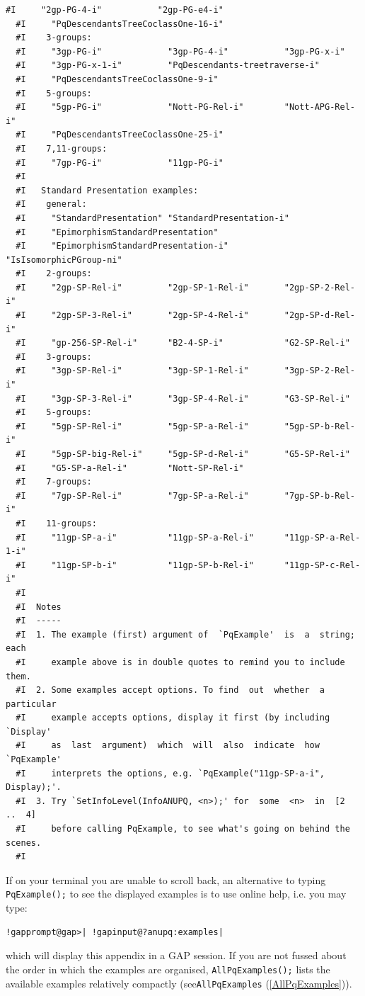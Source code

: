 \documentclass[a4paper,11pt]{report}
\begin{document}
{\begin{Verbatim}[commandchars=!@|,fontsize=\small,frame=single,label=Example]
  #I     "2gp-PG-4-i"           "2gp-PG-e4-i"
  #I     "PqDescendantsTreeCoclassOne-16-i"
  #I    3-groups:
  #I     "3gp-PG-i"             "3gp-PG-4-i"           "3gp-PG-x-i"
  #I     "3gp-PG-x-1-i"         "PqDescendants-treetraverse-i"
  #I     "PqDescendantsTreeCoclassOne-9-i"
  #I    5-groups:
  #I     "5gp-PG-i"             "Nott-PG-Rel-i"        "Nott-APG-Rel-i"
  #I     "PqDescendantsTreeCoclassOne-25-i"
  #I    7,11-groups:
  #I     "7gp-PG-i"             "11gp-PG-i"
  #I  
  #I   Standard Presentation examples:
  #I    general:
  #I     "StandardPresentation" "StandardPresentation-i"
  #I     "EpimorphismStandardPresentation"
  #I     "EpimorphismStandardPresentation-i"           "IsIsomorphicPGroup-ni"
  #I    2-groups:
  #I     "2gp-SP-Rel-i"         "2gp-SP-1-Rel-i"       "2gp-SP-2-Rel-i"
  #I     "2gp-SP-3-Rel-i"       "2gp-SP-4-Rel-i"       "2gp-SP-d-Rel-i"
  #I     "gp-256-SP-Rel-i"      "B2-4-SP-i"            "G2-SP-Rel-i"
  #I    3-groups:
  #I     "3gp-SP-Rel-i"         "3gp-SP-1-Rel-i"       "3gp-SP-2-Rel-i"
  #I     "3gp-SP-3-Rel-i"       "3gp-SP-4-Rel-i"       "G3-SP-Rel-i"
  #I    5-groups:
  #I     "5gp-SP-Rel-i"         "5gp-SP-a-Rel-i"       "5gp-SP-b-Rel-i"
  #I     "5gp-SP-big-Rel-i"     "5gp-SP-d-Rel-i"       "G5-SP-Rel-i"
  #I     "G5-SP-a-Rel-i"        "Nott-SP-Rel-i"
  #I    7-groups:
  #I     "7gp-SP-Rel-i"         "7gp-SP-a-Rel-i"       "7gp-SP-b-Rel-i"
  #I    11-groups:
  #I     "11gp-SP-a-i"          "11gp-SP-a-Rel-i"      "11gp-SP-a-Rel-1-i"
  #I     "11gp-SP-b-i"          "11gp-SP-b-Rel-i"      "11gp-SP-c-Rel-i"
  #I  
  #I  Notes
  #I  -----
  #I  1. The example (first) argument of  `PqExample'  is  a  string;  each
  #I     example above is in double quotes to remind you to include them.
  #I  2. Some examples accept options. To find  out  whether  a  particular
  #I     example accepts options, display it first (by including  `Display'
  #I     as  last  argument)  which  will  also  indicate  how  `PqExample'
  #I     interprets the options, e.g. `PqExample("11gp-SP-a-i", Display);'.
  #I  3. Try `SetInfoLevel(InfoANUPQ, <n>);' for  some  <n>  in  [2  ..  4]
  #I     before calling PqExample, to see what's going on behind the scenes.
  #I  
\end{Verbatim}
 If on your terminal you are unable to scroll back, an alternative to typing \texttt{PqExample();} to see the displayed examples is to use on\texttt{}line help,
i.e.{\nobreakspace} you may type: 
\begin{Verbatim}[commandchars=!@|,fontsize=\small,frame=single,label=Example]
  !gapprompt@gap>| !gapinput@?anupq:examples|
\end{Verbatim}
 which will display this appendix in a \textsf{GAP} session. If you are not fussed about the order in which the examples are
organised, \texttt{AllPqExamples();} lists the available examples relatively compactly (see{\nobreakspace}\texttt{AllPqExamples} (\ref{AllPqExamples})). 

}
\end{document}
